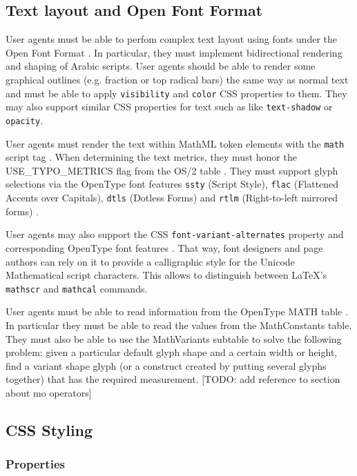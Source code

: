 \subsection{Text layout and Open Font Format}

User agents must be able to perfom complex text layout \cite{CTL} using
fonts under the Open Font Format \cite{OpenFontFormat3}. In particular, they
must implement bidirectional rendering and shaping of Arabic scripts.
User agents should be able to render some graphical outlines (e.g. fraction
or top radical bars) the same way as normal text and must be able to apply
{\tt visibility} and {\tt color} CSS properties to them. They may also
support similar CSS properties for text such as like {\tt text-shadow} or
{\tt opacity}.

User agents must render the text within MathML token elements with the
{\tt math} script tag \cite{OpenFontFormat3}. When determining the
text metrics, they must honor the USE\_TYPO\_METRICS flag from the OS/2 table
\cite{OpenFontFormat3}.
They must support glyph selections via the OpenType font
features {\tt ssty} (Script Style), {\tt flac}
(Flattened Accents over Capitals), {\tt dtls} (Dotless Forms)
and {\tt rtlm} (Right-to-left mirrored forms) \cite{OpenFontFormat3}.

User agents may also support the CSS {\tt font-variant-alternates} property
and corresponding OpenType font features \cite{CSS3Font} \cite{OpenFontFormat3}.
That way, font designers and page
authors can rely on it to provide a calligraphic style for the
Unicode Mathematical script characters. This allows to distinguish between
LaTeX's {\tt mathscr} and {\tt mathcal} commands.

User agents must be able to read information from the
OpenType MATH table \cite{OpenFontFormat3}.
In particular they must be able to read the values from the MathConstants
table. They must also be able to use the MathVariants subtable to solve the
following problem: given a particular default glyph shape and a
certain width or height, find a variant shape glyph (or a construct created by
putting several glyphs together) that has the required measurement.
[TODO: add reference to section about mo operators]

\subsection{CSS Styling}

\subsubsection{Properties}

